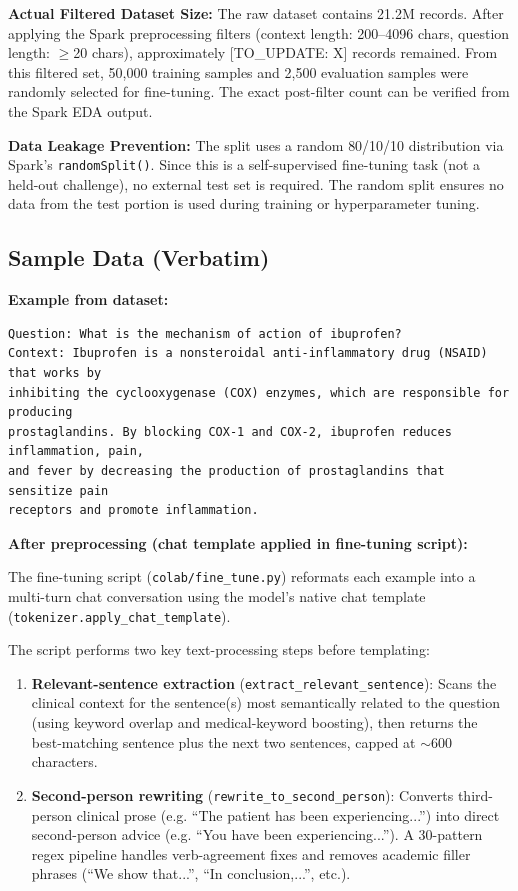 \documentclass[11pt,a4paper]{article}
\begin{document}
\textbf{Actual Filtered Dataset Size:} The raw dataset contains 21.2M records. After applying the Spark preprocessing filters (context length: 200--4096 chars, question length: $\geq$20 chars), approximately [TO\_UPDATE: X] records remained. From this filtered set, 50,000 training samples and 2,500 evaluation samples were randomly selected for fine-tuning. The exact post-filter count can be verified from the Spark EDA output.

\textbf{Data Leakage Prevention:} The split uses a random 80/10/10 distribution via Spark's \texttt{randomSplit()}. Since this is a self-supervised fine-tuning task (not a held-out challenge), no external test set is required. The random split ensures no data from the test portion is used during training or hyperparameter tuning.

\subsection{Sample Data (Verbatim)}

\textbf{Example from dataset:}
\begin{lstlisting}
Question: What is the mechanism of action of ibuprofen?
Context: Ibuprofen is a nonsteroidal anti-inflammatory drug (NSAID) that works by
inhibiting the cyclooxygenase (COX) enzymes, which are responsible for producing
prostaglandins. By blocking COX-1 and COX-2, ibuprofen reduces inflammation, pain,
and fever by decreasing the production of prostaglandins that sensitize pain
receptors and promote inflammation.
\end{lstlisting}

\textbf{After preprocessing (chat template applied in fine-tuning script):}

The fine-tuning script (\texttt{colab/fine\_tune.py}) reformats each example into a multi-turn chat conversation using the model's native chat template (\texttt{tokenizer.apply\_chat\_template}).

The script performs two key text-processing steps before templating:
\begin{enumerate}
    \item \textbf{Relevant-sentence extraction} (\texttt{extract\_relevant\_sentence}): Scans the clinical context for the sentence(s) most semantically related to the question (using keyword overlap and medical-keyword boosting), then returns the best-matching sentence plus the next two sentences, capped at $\sim$600 characters.
    \item \textbf{Second-person rewriting} (\texttt{rewrite\_to\_second\_person}): Converts third-person clinical prose (e.g. ``The patient has been experiencing...'') into direct second-person advice (e.g. ``You have been experiencing...''). A 30-pattern regex pipeline handles verb-agreement fixes and removes academic filler phrases (``We show that...'', ``In conclusion,...'', etc.).
\end{enumerate}
\end{document}
